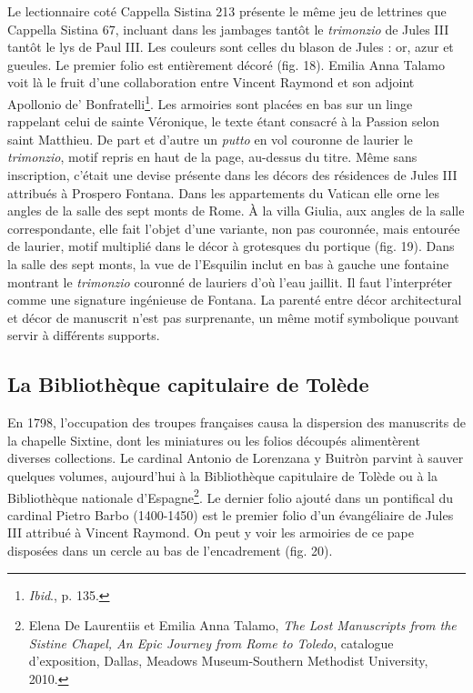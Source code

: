 \documentclass[12pt,twoside,openany]{book}
\begin{document}
Le lectionnaire coté Cappella Sistina 213 présente le même jeu de lettrines que Cappella Sistina 67, incluant dans les jambages tantôt le \textit{trimonzio} de Jules III tantôt le lys de Paul III. Les couleurs sont celles du blason de Jules : or, azur et gueules. Le premier folio est entièrement décoré (fig. 18). Emilia Anna Talamo voit là le fruit d’une collaboration entre Vincent Raymond et son adjoint Apollonio de’ Bonfratelli\footnote{\textit{Ibid}., p. 135.}. Les armoiries sont placées en bas sur un linge rappelant celui de sainte Véronique, le texte étant consacré à la Passion selon saint Matthieu. De part et d’autre un \textit{putto} en vol couronne de laurier le \textit{trimonzio}, motif repris en haut de la page, au-dessus du titre. Même sans inscription, c’était une devise présente dans les décors des résidences de Jules III attribués à Prospero Fontana. Dans les appartements du Vatican elle orne les angles de la salle des sept monts de Rome. À la villa Giulia, aux angles de la salle correspondante, elle fait l’objet d’une variante, non pas couronnée, mais entourée de laurier, motif multiplié dans le décor à grotesques du portique (fig. 19). Dans la salle des sept monts, la vue de l’Esquilin inclut en bas à gauche une fontaine montrant le \textit{trimonzio} couronné de lauriers d’où l’eau jaillit. Il faut l’interpréter comme une signature ingénieuse de Fontana. La parenté entre décor architectural et décor de manuscrit n’est pas surprenante, un même motif symbolique pouvant servir à différents supports.

\subsection{La Bibliothèque capitulaire de Tolède}

En 1798, l’occupation des troupes françaises causa la dispersion des manuscrits de la chapelle Sixtine, dont les miniatures ou les folios découpés alimentèrent diverses collections. Le cardinal Antonio de Lorenzana y Buitròn parvint à sauver quelques volumes, aujourd’hui à la Bibliothèque capitulaire de Tolède ou à la Bibliothèque nationale d’Espagne\footnote{Elena De Laurentiis et Emilia Anna Talamo, \textit{The Lost Manuscripts from the Sistine Chapel, An Epic Journey from Rome to Toledo}, catalogue d’exposition, Dallas, Meadows Museum-Southern Methodist University, 2010.}. Le dernier folio ajouté dans un pontifical du cardinal Pietro Barbo (1400-1450) est le premier folio d’un évangéliaire de Jules III attribué à Vincent Raymond. On peut y voir les armoiries de ce pape disposées dans un cercle au bas de l’encadrement (fig. 20).
\end{document}
